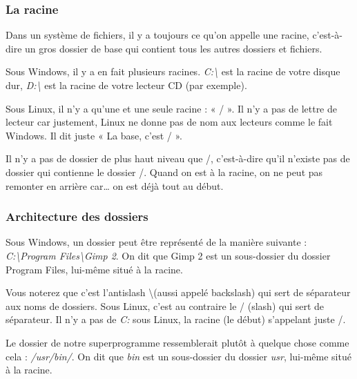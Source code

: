 \documentclass[10pt,fleqn]{article} %
\begin{document}
\subsubsection{La racine}

Dans un système de fichiers, il y a toujours ce qu'on appelle une racine, c'est-à-dire un gros dossier de base qui contient tous les autres dossiers et fichiers.

Sous Windows, il y a en fait plusieurs racines. \textit{C:\textbackslash} est la racine de votre disque dur, \textit{D:\textbackslash} est la racine de votre lecteur CD (par exemple).

Sous Linux, il n'y a qu'une et une seule racine : « / ». Il n'y a pas de lettre de lecteur car justement, Linux ne donne pas de nom aux lecteurs comme le fait Windows. Il dit juste « La base, c'est / ».

Il n'y a pas de dossier de plus haut niveau que /, c'est-à-dire qu'il n'existe pas de dossier qui contienne le dossier /. Quand on est à la racine, on ne peut pas remonter en arrière car… on est déjà tout au début.

\subsubsection{Architecture des dossiers}

Sous Windows, un dossier peut être représenté de la manière suivante : \textit{C:\textbackslash Program Files\textbackslash Gimp 2}. On dit que Gimp 2 est un sous-dossier du dossier Program Files, lui-même situé à la racine.

Vous noterez que c'est l'antislash \textbackslash (aussi appelé backslash) qui sert de séparateur aux noms de dossiers. Sous Linux, c'est au contraire le / (slash) qui sert de séparateur.
Il n'y a pas de \textit{C:} sous Linux, la racine (le début) s'appelant juste /.

Le dossier de notre superprogramme ressemblerait plutôt à quelque chose comme cela : \textit{/usr/bin/}. On dit que \textit{bin} est un sous-dossier du dossier \textit{usr}, lui-même situé à la racine.
\end{document}

